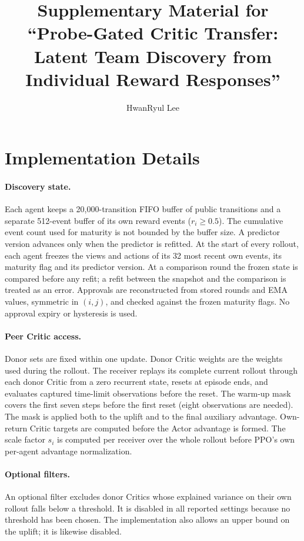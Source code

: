 \documentclass[10pt]{article}
\title{Supplementary Material for\\``Probe-Gated Critic Transfer: Latent Team Discovery from Individual Reward Responses''}
\author{HwanRyul Lee}
\date{}
\begin{document}
\maketitle

\section{Implementation Details}
\paragraph{Discovery state.} Each agent keeps a 20{,}000-transition FIFO buffer of public transitions and a separate 512-event buffer of its own reward events ($r_i\ge0.5$). The cumulative event count used for maturity is not bounded by the buffer size. A predictor version advances only when the predictor is refitted. At the start of every rollout, each agent freezes the views and actions of its 32 most recent own events, its maturity flag and its predictor version. At a comparison round the frozen state is compared before any refit; a refit between the snapshot and the comparison is treated as an error. Approvals are reconstructed from stored rounds and EMA values, symmetric in $(i,j)$, and checked against the frozen maturity flags. No approval expiry or hysteresis is used.

\paragraph{Peer Critic access.} Donor sets are fixed within one update. Donor Critic weights are the weights used during the rollout. The receiver replays its complete current rollout through each donor Critic from a zero recurrent state, resets at episode ends, and evaluates captured time-limit observations before the reset. The warm-up mask covers the first seven steps before the first reset (eight observations are needed). The mask is applied both to the uplift and to the final auxiliary advantage. Own-return Critic targets are computed before the Actor advantage is formed. The scale factor $s_i$ is computed per receiver over the whole rollout before PPO's own per-agent advantage normalization.

\paragraph{Optional filters.} An optional filter excludes donor Critics whose explained variance on their own rollout falls below a threshold. It is disabled in all reported settings because no threshold has been chosen. The implementation also allows an upper bound on the uplift; it is likewise disabled.
\end{document}
